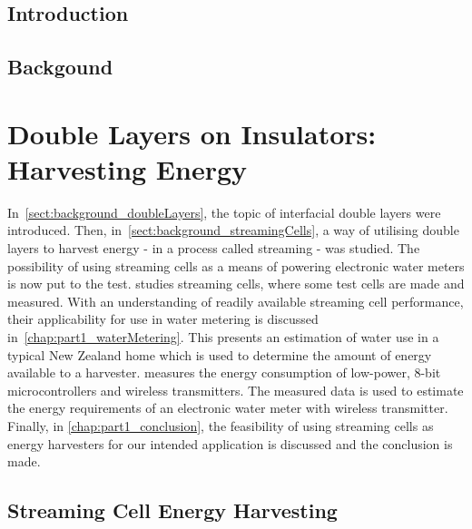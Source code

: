 \tableofcontents{}
\listoffigures
\listoftables
\doublespacing


\chapter{Introduction}
  \label{chap:introduction_main}
  
\chapter{Backgound}
  \label{chap:background}
  


\part{Double Layers on Insulators: Harvesting Energy}
  \label{part:doubleLayersOnInsulators}

  In~\cref{sect:background_doubleLayers}, the topic of interfacial double layers were introduced.
  Then, in~\cref{sect:background_streamingCells}, a way of utilising double layers to harvest energy - in a process called streaming - was studied.
  The possibility of using streaming cells as a means of powering electronic water meters is now put to the test.
   studies streaming cells, where some test cells are made and measured.
  With an understanding of readily available streaming cell performance, their applicability for use in water metering is discussed in~\cref{chap:part1_waterMetering}.
  This presents an estimation of water use in a typical New Zealand home which is used to determine the amount of energy available to a harvester.
   measures the energy consumption of low-power, 8-bit microcontrollers and wireless transmitters.
  The measured data is used to estimate the energy requirements of an electronic water meter with wireless transmitter.
  Finally, in \cref{chap:part1_conclusion}, the feasibility of using streaming cells as energy harvesters for our intended application is discussed and the conclusion is made.

  \chapter{Streaming Cell Energy Harvesting}
    \label{chap:part1_streamingCellHarvesters}
    

